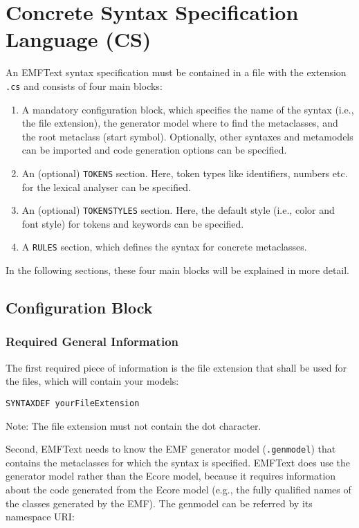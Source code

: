 \chapter{Concrete Syntax Specification Language (CS)}

An EMFText syntax specification must be contained in a file with the 
extension \texttt{.cs} and consists of four main blocks:

\begin{enumerate}
  \item A mandatory configuration block, which specifies the name of the syntax
        (i.e., the file extension), the generator model where to find the
        metaclasses, and the root metaclass (start symbol). Optionally, other
        syntaxes and metamodels can be imported and code generation options can
        be specified.
  \item An (optional) \texttt{TOKENS} section. Here, token types like identifiers, numbers etc.
  		 for the lexical analyser can be specified.
  \item An (optional) \texttt{TOKENSTYLES} section. Here, the default style
        (i.e., color and font style) for tokens and keywords can be specified.
  \item A \texttt{RULES} section, which defines the syntax for concrete
        metaclasses.
\end{enumerate}

In the following sections, these four main blocks will be explained in more
detail.

\section{Configuration Block}

\subsection{Required General Information}

The first required piece of information is the file extension that shall
be used for the files, which will contain your models:

\begin{lstlisting}
SYNTAXDEF yourFileExtension
\end{lstlisting}

Note: The file extension must not contain the dot character.

Second, EMFText needs to know the EMF generator model (\texttt{.genmodel}) that
contains the metaclasses for which the syntax is specified. EMFText does use
the generator model rather than the Ecore model, because it requires
information about the code generated from the Ecore model (e.g., the fully
qualified names of the classes generated by the EMF). The genmodel can be referred 
by its namespace URI: 

